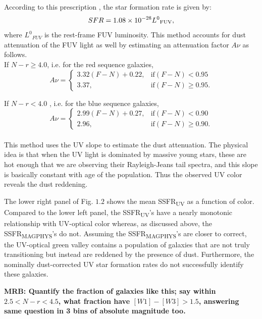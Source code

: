 According to this prescription \citep{salim_uv_2007-1}, 
the star formation rate is given by:
$$ SFR = 1.08 \times 10^{-28}{L^{0}}_{\rm FUV}, $$
where ${L^{0}}_{FUV}$ is the rest-frame FUV luminosity. This method accounts for dust attenuation of the FUV light as well by estimating an attenuation factor $A\nu$ as follows.\\

If $N-r \geq 4.0$, i.e. for the red sequence galaxies,\\

$$ A\nu = \begin{cases} 3.32 (F-N) + 0.22, & \text{if} (F-N) < 0.95\\3.37, & \text{if} (F-N) \geq 0.95. \end{cases}$$

If $N-r < 4.0$ , i.e. for the blue sequence galaxies,\\

$$A\nu = \begin{cases} 2.99(F-N) + 0.27, & \text{if}(F-N) < 0.90\\2.96, & \text{if} (F-N) \geq 0.90. \end{cases}$$\\

This method uses the UV slope to estimate the dust attenuation. The 
physical idea is that when the UV light is dominated by massive young
stars, these are hot enough that we are observing their Rayleigh-Jeans
tail spectra, and this slope is basically constant with age of the
population. Thus the observed UV color reveals the dust reddening.

The lower right panel of Fig. $1.2$ shows the mean 
SSFR\textsubscript{UV} as a function of color. Compared to the 
lower left panel, the SSFR\textsubscript{UV}'s have a nearly 
monotonic relationship with UV-optical color whereas, as discussed 
above, the SSFR\textsubscript{MAGPHYS}'s do not. Assuming 
the SSFR\textsubscript{MAGPHYS}'s are closer to correct, the 
UV-optical green valley contains a population of galaxies that 
are not truly transitioning but instead are reddened by the 
presence of dust. Furthermore, the nominally dust-corrected 
UV star formation rates do not successfully identify these 
galaxies. 

\textbf{MRB: Quantify the fraction of galaxies like this; say 
within $2.5 < N-r < 4.5$, what fraction have $[W1]-[W3] > 1.5$, 
answering same question in 3 bins of absolute magnitude too.}
\\

